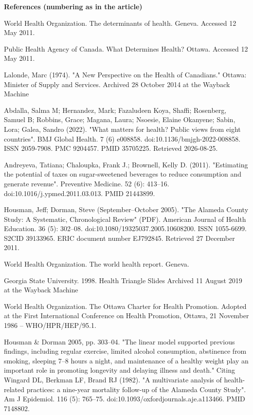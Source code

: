 \medskip\textbf{References (numbering as in the article)}
{\footnotesize\begin{description}\setlength{\itemsep}{0pt}
\item[{[12]}] World Health Organization. The determinants of health. Geneva. Accessed 12 May 2011.
\item[{[13]}] Public Health Agency of Canada. What Determines Health? Ottawa. Accessed 12 May 2011.
\item[{[14]}] Lalonde, Marc (1974). "A New Perspective on the Health of Canadians." Ottawa: Minister of Supply and Services. Archived 28 October 2014 at the Wayback Machine
\item[{[15]}] Abdalla, Salma M; Hernandez, Mark; Fazaludeen Koya, Shaffi; Rosenberg, Samuel B; Robbins, Grace; Magana, Laura; Nsoesie, Elaine Okanyene; Sabin, Lora; Galea, Sandro (2022). "What matters for health? Public views from eight countries". BMJ Global Health. 7 (6) e008858. doi:10.1136/bmjgh-2022-008858. ISSN 2059-7908. PMC 9204457. PMID 35705225. Retrieved 2026-08-25.
\item[{[16]}] Andreyeva, Tatiana; Chaloupka, Frank J.; Brownell, Kelly D. (2011). "Estimating the potential of taxes on sugar-sweetened beverages to reduce consumption and generate revenue". Preventive Medicine. 52 (6): 413–16. doi:10.1016/j.ypmed.2011.03.013. PMID 21443899.
\item[{[17]}] Housman, Jeff; Dorman, Steve (September–October 2005). "The Alameda County Study: A Systematic, Chronological Review" (PDF). American Journal of Health Education. 36 (5): 302–08. doi:10.1080/19325037.2005.10608200. ISSN 1055-6699. S2CID 39133965. ERIC document number EJ792845. Retrieved 27 December 2011.
\item[{[18]}] World Health Organization. The world health report. Geneva.
\item[{[19]}] Georgia State University. 1998. Health Triangle Slides Archived 11 August 2019 at the Wayback Machine
\item[{[20]}] World Health Organization. The Ottawa Charter for Health Promotion. Adopted at the First International Conference on Health Promotion, Ottawa, 21 November 1986 – WHO/HPR/HEP/95.1.
\item[{[21]}] Housman \& Dorman 2005, pp. 303–04. "The linear model supported previous findings, including regular exercise, limited alcohol consumption, abstinence from smoking, sleeping 7–8 hours a night, and maintenance of a healthy weight play an important role in promoting longevity and delaying illness and death." Citing Wingard DL, Berkman LF, Brand RJ (1982). "A multivariate analysis of health-related practices: a nine-year mortality follow-up of the Alameda County Study". Am J Epidemiol. 116 (5): 765–75. doi:10.1093/oxfordjournals.aje.a113466. PMID 7148802.

\end{description}}
